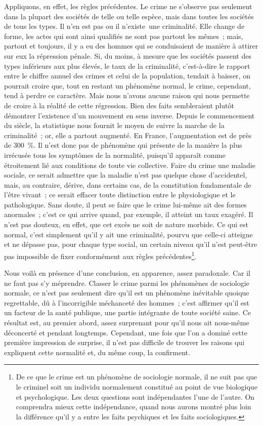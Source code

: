 \documentclass[french,twoside]{book} %
\begin{document}
Appliquons, en effet, les règles précédentes. Le crime ne s’observe pas seulement dans la plupart des sociétés de telle ou telle espèce, mais dans toutes les sociétés de tous les types. Il n’en est pas ou il n’existe une criminalité. Elle change de forme, les actes qui sont ainsi qualifiés ne sont pas partout les mêmes ; mais, partout et toujours, il y a eu des hommes qui se conduisaient de manière à attirer sur eux la répression pénale. Si, du moins, à mesure que les sociétés passent des types inférieurs aux plus élevés, le taux de la criminalité, c’est-à-dire le rapport entre le chiffre annuel des crimes et celui de la population, tendait à baisser, on pourrait croire que, tout en restant un phénomène normal, le crime, cependant, tend à perdre ce caractère. Mais nous n’avons aucune raison qui nous permette de croire à la réalité de cette régression. Bien des faits sembleraient plutôt démontrer l’existence d’un mouvement en sens inverse. Depuis le commencement du siècle, la statistique nous fournit le moyen de suivre la marche de la criminalité ; or, elle a partout augmenté. En France, l’augmentation est de près de 300 \%. Il n’est donc pas de phénomène qui présente de la manière la plus irrécusée tous les symptômes de la normalité, puisqu’il apparaît comme étroitement lié aux conditions de toute vie collective. Faire du crime une maladie sociale, ce serait admettre que la maladie n’est pas quelque chose d’accidentel, mais, au contraire, dérive, dans certains cas, de la constitution fondamentale de l’être vivant ; ce serait effacer toute distinction entre le physiologique et le pathologique. Sans doute, il peut se faire que le crime lui-même ait des formes anormales ; c’est ce qui arrive quand, par exemple, il atteint un taux exagéré. Il n’est pas douteux, en effet, que cet excès ne soit de nature morbide. Ce qui est normal, c’est simplement qu’il y ait une criminalité, pourvu que celle-ci atteigne et ne dépasse pas, pour chaque type social, un certain niveau qu’il n’est peut-être pas impossible de fixer conformément aux règles précédentes\footnote{ De ce que le crime est un phénomène de sociologie normale, il ne suit pas que le criminel soit un individu normalement constitué au point de vue biologique et psychologique. Les deux questions sont indépendantes l’une de l’autre. On comprendra mieux cette indépendance, quand nous aurons montré plus loin la différence qu’il y a entre les faits psychiques et les faits sociologiques.}.\par
Nous voilà en présence d’une conclusion, en apparence, assez paradoxale. Car il ne faut pas s’y méprendre. Classer le crime parmi les phénomènes de sociologie normale, ce n’est pas seulement dire qu’il est un phénomène inévitable quoique regrettable, dû à l’incorrigible méchanceté des hommes ; c’est affirmer qu’il est un facteur de la santé publique, une partie intégrante de toute société saine. Ce résultat est, au premier abord, assez surprenant pour qu’il nous ait nous-même déconcerté et pendant longtemps. Cependant, une fois que l’on a dominé cette première impression de surprise, il n’est pas difficile de trouver les raisons qui expliquent cette normalité et, du même coup, la confirment.\par
\end{document}
